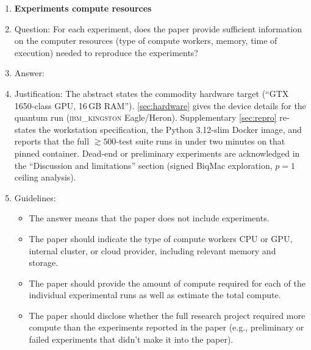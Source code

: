 \begin{enumerate}
\item {\bf Experiments compute resources}
    \item[] Question: For each experiment, does the paper provide sufficient information on the computer resources (type of compute workers, memory, time of execution) needed to reproduce the experiments?
    \item[] Answer: \answerYes{} %
    \item[] Justification: The abstract states the commodity hardware
        target (``GTX\,1650-class GPU, 16\,GB RAM''). \cref{sec:hardware}
        gives the device details for the quantum run
        (\textsc{ibm\_kingston} Eagle/Heron). Supplementary
        \cref{sec:repro} re-states the workstation specification, the
        Python 3.12-slim Docker image, and reports that the full
        ${\gtrsim}500$-test suite runs in under two minutes on that
        pinned container. Dead-end or preliminary experiments are
        acknowledged in the ``Discussion and limitations'' section
        (signed BiqMac exploration, $p{=}1$ \QAOA ceiling analysis).
    \item[] Guidelines:
    \begin{itemize}
        \item The answer \answerNA{} means that the paper does not include experiments.
        \item The paper should indicate the type of compute workers CPU or GPU, internal cluster, or cloud provider, including relevant memory and storage.
        \item The paper should provide the amount of compute required for each of the individual experimental runs as well as estimate the total compute.
        \item The paper should disclose whether the full research project required more compute than the experiments reported in the paper (e.g., preliminary or failed experiments that didn't make it into the paper).
    \end{itemize}


\end{enumerate}
